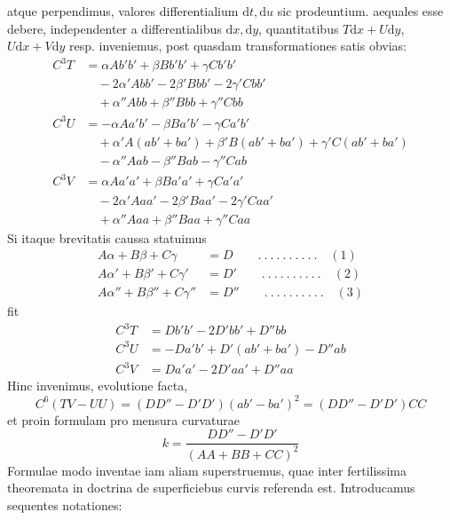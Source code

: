 %
atque perpendimus, valores differentialium \(\mathrm{d}t,\mathrm{d}u\) sic prodeuntium. aequales esse debere, independenter a differentialibus \(\mathrm{d}x,\mathrm{d}y\), quantitatibus \(T\mathrm{d}x+U\mathrm{d}y\), \(U\mathrm{d}x+V\mathrm{d}y\) resp. inveniemus, post quasdam transformationes satis obvias:
\[
\begin{aligned}
C^3T&=\alpha Ab'b'+\beta Bb'b'+\gamma Cb'b'\\
&\quad-2\alpha'Abb'-2\beta'Bbb'-2\gamma'Cbb'\\
&\quad+\alpha''Abb+\beta''Bbb+\gamma''Cbb\\
C^3U&=-\alpha Aa'b'-\beta Ba'b'-\gamma Ca'b'\\
&\quad+\alpha'A(ab'+ba')+\beta'B(ab'+ba')+\gamma'C(ab'+ba')\\
&\quad-\alpha''Aab-\beta''Bab-\gamma''Cab\\
C^3V&=\alpha Aa'a'+\beta Ba'a'+\gamma Ca'a'\\
&\quad-2\alpha'Aaa'-2\beta'Baa'-2\gamma'Caa'\\
&\quad+\alpha''Aaa+\beta''Baa+\gamma''Caa
\end{aligned}
\]
Si itaque brevitatis caussa statuimus
\[
\begin{aligned}
A\alpha+B\beta+C\gamma&=D\qquad .\ .\ .\ .\ .\ .\ .\ .\ .\ .\quad(1)\\
A\alpha'+B\beta'+C\gamma'&=D'\qquad .\ .\ .\ .\ .\ .\ .\ .\ .\ .\quad(2)\\
A\alpha''+B\beta''+C\gamma''&=D''\qquad .\ .\ .\ .\ .\ .\ .\ .\ .\ .\quad(3)
\end{aligned}
\]
fit
\[
\begin{aligned}
C^3T&=Db'b'-2D'bb'+D''bb\\
C^3U&=-Da'b'+D'(ab'+ba')-D''ab\\
C^3V&=Da'a'-2D'aa'+D''aa
\end{aligned}
\]
Hinc invenimus, evolutione facta,
\[
C^6(TV-UU)=(DD''-D'D')(ab'-ba')^2=(DD''-D'D')CC
\]
et proin formulam pro mensura curvaturae
\[
k=\frac{DD''-D'D'}{(AA+BB+CC)^2}
\]
Formulae modo inventae iam aliam superstruemus, quae inter fertilissima theoremata in doctrina de superficiebus curvis referenda est. Introducamus sequentes notationes:
